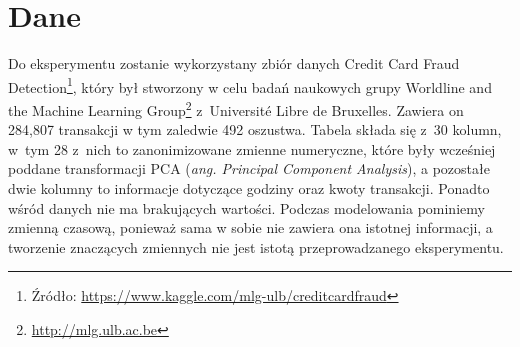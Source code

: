 \documentclass[inzynierska]{pwr_wmat_praca_dyplomowa}
\theoremstyle{plain}
\numberwithin{theorem}{chapter}
\theoremstyle{definition}
\numberwithin{theorem}{chapter}
\begin{document}
\section{Dane}
Do eksperymentu zostanie wykorzystany zbiór danych Credit Card Fraud Detection\footnote{Źródło: \url{https://www.kaggle.com/mlg-ulb/creditcardfraud}}, który był stworzony w celu badań naukowych grupy Worldline and the Machine Learning Group\footnote{\url{http://mlg.ulb.ac.be}} z~Université Libre de Bruxelles. Zawiera on 284,807 transakcji w tym zaledwie 492 oszustwa. Tabela składa się z~30 kolumn, w~tym 28 z~nich to zanonimizowane zmienne numeryczne, które były wcześniej poddane transformacji PCA (\textit{ang. Principal Component Analysis}), a pozostałe dwie kolumny to informacje dotyczące godziny oraz kwoty transakcji. Ponadto wśród danych nie ma brakujących wartości. Podczas modelowania pominiemy zmienną czasową, ponieważ sama w sobie nie zawiera ona istotnej informacji, a tworzenie znaczących zmiennych nie jest istotą przeprowadzanego eksperymentu. 
\end{document}
